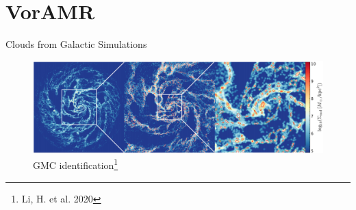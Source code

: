 \documentclass[aspectratio=169]{beamer}
\begin{document}
\section{VorAMR}
%
%
% 
\begin{frame}{Clouds from Galactic Simulations}
	\begin{figure}[h!]
                \centering
                \includegraphics[width=\linewidth]{../images/AREPO_galaxy.png} \\
                GMC identification\footnote{Li, H. et al. 2020}
                \label{fig:arepo_galaxy}
	\end{figure}
\end{frame}
%
%
%
%
%
\end{document}
